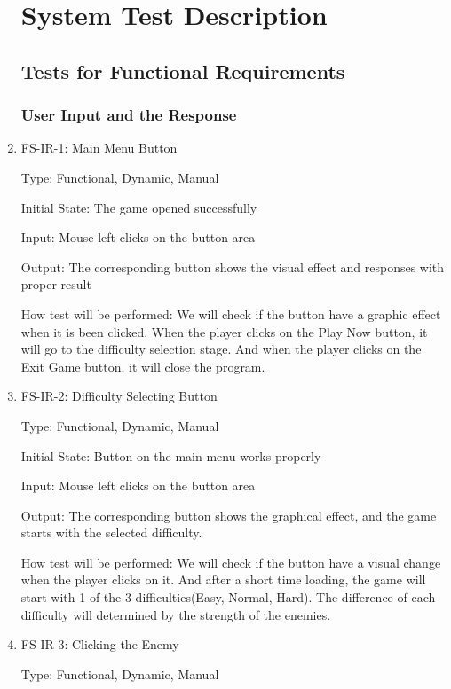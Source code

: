 \documentclass[12pt]{article}
\begin{document}
\begin{enumerate}
\section{System Test Description}
\subsection{Tests for Functional Requirements}

\subsubsection{User Input and the Response}
					
    \item{FS-IR-1: Main Menu Button}
    
    Type: Functional, Dynamic, Manual
					
	Initial State: The game opened successfully
					
	Input: Mouse left clicks on the button area
					
	Output: The corresponding button shows the visual effect and responses with proper result

	How test will be performed: We will check if the button have a graphic effect when it is been clicked. When the player clicks on the Play Now button, it will go to the difficulty selection stage. And when the player clicks on the Exit Game button, it will close the program.
	

	\item{FS-IR-2: Difficulty Selecting Button}

	Type: Functional, Dynamic, Manual
	
	Initial State: Button on the main menu works properly
	
	Input: Mouse left clicks on the button area
	
	Output: The corresponding button shows the graphical effect, and the game starts with the selected difficulty.
	
	How test will be performed: We will check if the button have a visual change when the player clicks on it. And after a short time loading, the game will start with 1 of the 3 difficulties(Easy, Normal, Hard). The difference of each difficulty will determined by the strength of the enemies.
	
	
	\item{FS-IR-3: Clicking the Enemy}
	
	Type: Functional, Dynamic, Manual
	

\end{enumerate}
\end{document}
